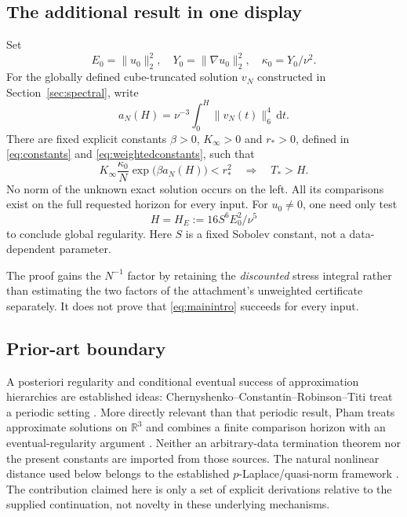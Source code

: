 \documentclass[11pt,a4paper]{article}
\theoremstyle{definition}\newtheorem{definition}[theorem]{Definition}
\theoremstyle{remark}\newtheorem{remark}[theorem]{Remark}
\newcommand{\R}{\mathbb R}
\newcommand{\dd}{\,\mathrm d}
\newcommand{\norm}[1]{\lVert #1\rVert}
\newcommand{\rstar}{r_*}
\newcommand{\kin}{\kappa_0}
\newcommand{\Kinf}{K_\infty}
\numberwithin{equation}{section}
\begin{document}
\subsection{The additional result in one display}
Set
\begin{equation}\label{eq:initial}
 E_0=\norm{u_0}_2^2,\quad Y_0=\norm{\nabla u_0}_2^2,
 \quad\kin=Y_0/\nu^2.
\end{equation}
For the globally defined cube-truncated solution $v_N$ constructed in Section~\ref{sec:spectral}, write
\begin{equation}\label{eq:aNintro}
 a_N(H)=\nu^{-3}\int_0^H\norm{v_N(t)}_6^4\dd t.
\end{equation}
There are fixed explicit constants $\beta>0$, $\Kinf>0$ and $\rstar>0$, defined in \eqref{eq:constants} and \eqref{eq:weightedconstants}, such that
\begin{equation}\label{eq:mainintro}
 \boxed{\quad
 \Kinf\frac{\kin}{N}\exp\!\bigl(\beta a_N(H)\bigr)<\rstar^2
 \quad\Longrightarrow\quad T_*>H.\quad}
\end{equation}
No norm of the unknown exact solution occurs on the left. All its comparisons exist on the full requested horizon for every input. For $u_0\ne0$, one need only test
\begin{equation}\label{eq:HEintro}
 H=H_E:=16S^6 E_0^2/\nu^5
\end{equation}
to conclude global regularity. Here $S$ is a fixed Sobolev constant, not a data-dependent parameter.

The proof gains the $N^{-1}$ factor by retaining the \emph{discounted} stress integral rather than estimating the two factors of the attachment's unweighted certificate separately. It does not prove that \eqref{eq:mainintro} succeeds for every input.

\subsection{Prior-art boundary}
A posteriori regularity and conditional eventual success of approximation hierarchies are established ideas: Chernyshenko--Constantin--Robinson--Titi treat a periodic setting \cite{CCRT}. More directly relevant than that periodic result, Pham treats approximate solutions on $\R^3$ and combines a finite comparison horizon with an eventual-regularity argument \cite{Pham}. Neither an arbitrary-data termination theorem nor the present constants are imported from those sources. The natural nonlinear distance used below belongs to the established $p$-Laplace/quasi-norm framework \cite{DieningKreuzer}. The contribution claimed here is only a set of explicit derivations relative to the supplied continuation, not novelty in these underlying mechanisms.
\end{document}
